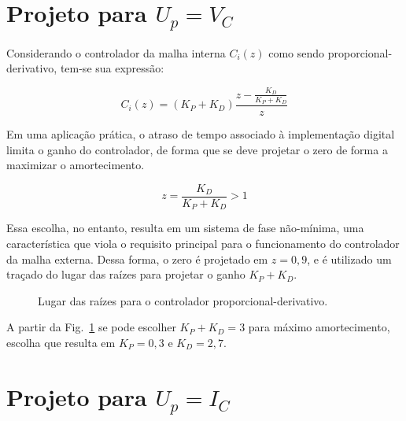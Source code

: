 \section{Projeto para $U_p = V_C$}

    Considerando o controlador da malha interna $C_i(z)$ como sendo proporcional-derivativo,
    tem-se sua expressão:

    \begin{equation}
        C_i(z) = \left( K_P + K_D \right) \frac{z- \frac{K_D}{K_P+K_D}}{z}
    \end{equation}

    Em uma aplicação prática, o atraso de tempo associado à implementação digital limita o
    ganho do controlador, de forma que se deve projetar o zero de forma a maximizar o amortecimento.

    \begin{equation*}
        z = \frac{K_D}{K_P+K_D} > 1
    \end{equation*}

    Essa escolha, no entanto, resulta em um sistema de fase não-mínima, uma característica
    que viola o requisito principal para o funcionamento do controlador da malha externa. Dessa
    forma, o zero é projetado em $z=0,9$, e é utilizado um traçado do lugar das raízes para projetar
    o ganho $K_P+K_D$.

    \begin{figure}[htb]
        \renewcommand\figurename{Fig.}
        \caption{Lugar das raízes para o controlador proporcional-derivativo.}
        \label{fig:rlocus_vc}
    \end{figure}

    A partir da Fig.~\ref{fig:rlocus_vc} se pode escolher $K_P+K_D = 3$ para máximo amortecimento,
    escolha que resulta em $K_P = 0,3$ e $K_D = 2,7$.


\section{Projeto para $U_p = I_C$}

